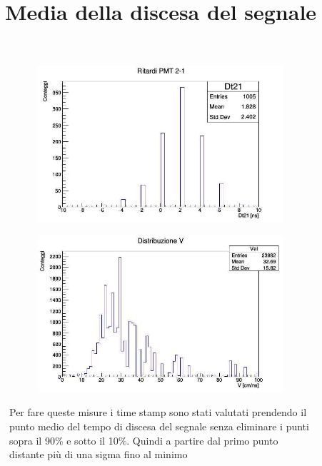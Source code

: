 \documentclass[a4paper]{article}
\begin{document}
\begin{figure}[H]
     \centering
     \title{Media della discesa del segnale}
     \begin{center}
     \begin{subfigure}[b]{0.4\textwidth}
         \centering
         \includegraphics[width=\textwidth]{./immagini/TimeOfFlight/Rit21MidNegSlo.jpg}
         \caption{}
         \label{fig:Dt21MidNegSlo}
     \end{subfigure}
     \hfill
     \begin{subfigure}[b]{0.4\textwidth}
         \centering
         \includegraphics[width=\textwidth]{./immagini/TimeOfFlight/VMidNegSlo.jpg}
         \caption{}
         \label{fig:VMidNegSlo}
     \end{subfigure}
     \end{center}
     \caption{Per fare queste misure i time stamp sono stati valutati prendendo il punto medio del tempo di discesa del segnale senza eliminare i punti sopra il 90$\%$ e sotto il 10$\%$. Quindi a partire dal primo punto distante più di una sigma fino al minimo}        
     \label{fig:MidNegSlo}
\end{figure}
\end{document}
